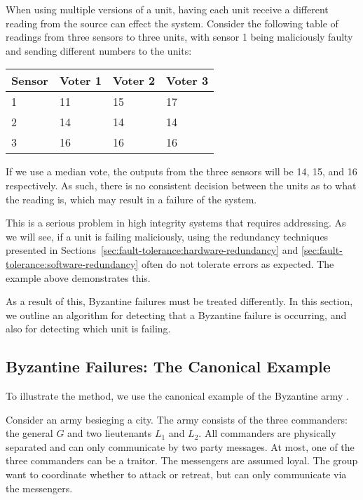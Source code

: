 When using multiple versions of a unit, having each unit receive a different reading from the source can effect the system. Consider the following table of readings from three sensors to three units, with sensor 1 being maliciously faulty and sending different numbers to the units:

\begin{center}
\begin{tabular}{llll}
\hline
 {\bf Sensor} & {\bf Voter 1} & {\bf Voter 2} & {\bf Voter 3}\\
\hline
 1 & 11 & 15 & 17\\
 2 & 14 & 14 & 14\\
 3 & 16 & 16 & 16\\
\hline
\end{tabular}
\end{center}

If we use a median vote, the outputs from the three sensors will be 14, 15, and 16 respectively. As such, there is no consistent decision between the units as to what the reading is, which may result in a failure of the system.

This is a serious problem in high integrity systems that requires addressing. As we will see, if a unit is failing maliciously, using the redundancy techniques presented in Sections~\ref{sec:fault-tolerance:hardware-redundancy} and \ref{sec:fault-tolerance:software-redundancy} often do not tolerate errors as expected. The example above demonstrates this.

As a result of this, Byzantine failures must be treated differently. In this section, we outline an algorithm for detecting that a Byzantine failure is occurring, and also for detecting which unit is failing.


\subsection{Byzantine Failures: The Canonical Example} 

To illustrate the method, we use the canonical example of the Byzantine army \cite{lamport82}.

Consider an army besieging a city. The army consists of the three commanders: the general \(G\)  and two lieutenants \(L_1\) and \(L_2\). All commanders are physically separated and can only communicate by two party messages. At most, one of the three commanders can be a traitor.  The messengers are assumed loyal. The group want to coordinate whether to attack or retreat, but can only communicate via the messengers.


